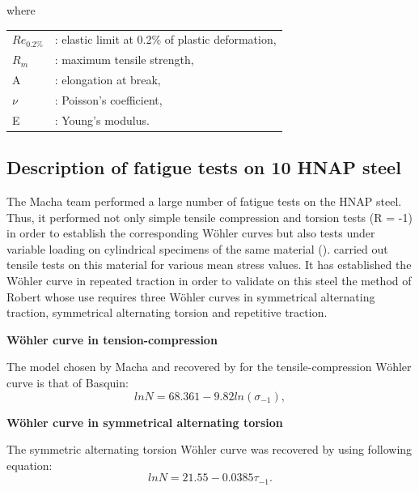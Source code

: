 \documentclass[3p,times,procedia,number]{elsarticle}
\begin{document}
where 
\begin{table}[!h]
	\centering
	\begin{tabular}{ll}
		$Re_{0.2\%}$ & : elastic limit at 0.2\% of plastic deformation, \\
		$R_m$      & : maximum tensile strength,                                                                  \\
		A          & : elongation at break,                                                                       \\
		$\nu$      & : Poisson's coefficient,                                                                     \\
		E          & : Young's modulus.                                                                          
	\end{tabular}
\end{table}

\subsection{Description of fatigue tests on 10 HNAP steel}
The Macha team performed a large number of fatigue tests on the HNAP steel. Thus, it performed not only simple tensile compression and torsion tests (R = -1) in order to establish the corresponding Wöhler curves but also tests under variable loading on cylindrical specimens of the same material (\cite{ACHTELIC1994}). \cite{VIDAL1996} carried out tensile tests on this material for various mean stress values. It has established the Wöhler curve in repeated traction in order to validate on this steel the method of Robert whose use requires three Wöhler curves in symmetrical alternating traction, symmetrical alternating torsion and repetitive traction.

\vspace{6pt}
\noindent
\textbf{Wöhler curve in tension-compression}

The model chosen by Macha and recovered by  \cite{jabbado:pastel-00002116} for the tensile-compression Wöhler curve is that of Basquin:
\begin{equation}
lnN=68.361 − 9.82ln\left( \sigma_{-1}\right) ,
\end{equation}

\noindent
\vspace{6pt}
\textbf{Wöhler curve in symmetrical alternating torsion}
\vspace{6pt}

The symmetric alternating torsion Wöhler curve was recovered by \cite{jabbado:pastel-00002116} using following equation:
\begin{equation}
lnN=21.55 − 0.0385\tau_{-1}.
\end{equation}
\end{document}
